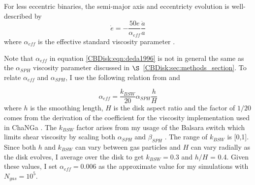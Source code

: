 For less eccentric binaries, the semi-major axis and eccentricty evolution is well-described by 
\begin{equation}
\label{CBDisk:eqn:deda1996}
\dot{e} = -\frac{50e}{\alpha_{eff}}\frac{\dot{a}}{a}
\end{equation}
where $\alpha_{eff}$ is the effective standard viscosity parameter \citep{Artymowicz1996b,Dermine2013}.  

Note that $\alpha_{eff}$ in equation \ref{CBDisk:eqn:deda1996} is not in 
general the same as the $\alpha_{SPH}$ viscosity parameter discussed in $\S$~\ref{CBDisk:sec:methods_section}.  To relate $\alpha_{eff}$ and $\alpha_{SPH}$, I use the following relation from \citet{Lodato2010} and \citet{Meru2012}

\begin{equation}
\label{CBDisk:eqn:alphas}
\alpha_{eff} = \frac{k_{BSW}}{20} \alpha_{SPH} \frac{h}{H}
\end{equation}
where $h$ is the smoothing length, $H$ is the disk aspect ratio and the factor of $1/20$ comes from the \citet{Meru2012} derivation of the coefficient for 
the \citet{Monaghan1983} viscosity implementation used in ChaNGa \citep{Murray1996}.  The $k_{BSW}$ factor arises from my usage of the  Balsara switch which 
limits shear viscosity by scaling both $\alpha_{SPH}$ and $\beta_{SPH}$ \citep{Balsara1995}.  The range of $k_{BSW}$ is [0,1].  Since both $h$ and $k_{BSW}$ 
can vary between gas particles and $H$ can vary radially as the disk evolves, I average over the disk to get $k_{BSW} = 0.3$ and $h/H$ = 0.4.  Given these 
values, I set $\alpha_{eff} = 0.006$ as the approximate value for my simulations with $N_{gas} = 10^5$.

